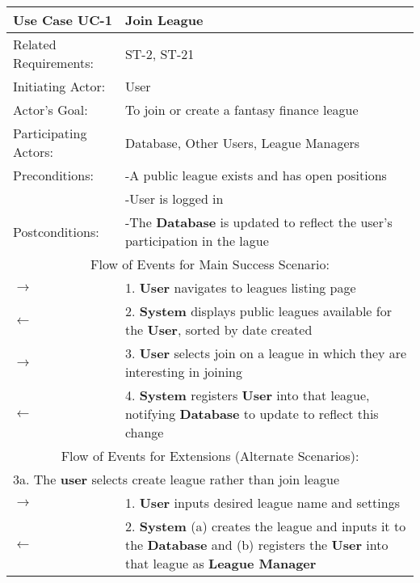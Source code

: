 \begin{centering}
\renewcommand\arraystretch{1.3} %
\begin{longtable}{|p{1.2in} p{5in}|}
\hline
\bfseries{\color{color1}Use Case UC-1} & \bfseries{\color{color1}Join League} \\
\hline
Related Requirements: & ST-2, ST-21 \\ 
Initiating Actor:     & User \\
Actor's Goal:         & To join or create a fantasy finance league \\
Participating Actors:  & Database, Other Users, League Managers\\
Preconditions:        & -A public league exists and has open positions \\
 & -User is logged in \\
Postconditions:       & -The \textbf{Database} is updated to reflect the user's participation in the lague \\
\hline
\multicolumn{2}{|c|}{\color{color1}Flow of Events for Main Success Scenario:}\\
\hline
$\rightarrow$ & 1. \textbf{User} navigates to leagues listing page \\
$\leftarrow$ & 2. \textbf{System} displays public leagues available for the \textbf{User}, sorted by date created \\
$\rightarrow$ & 3. \textbf{User} selects join on a league in which they are interesting in joining \\
$\leftarrow$ & 4. \textbf{System} registers \textbf{User} into that league, notifying \textbf{Database} to update to reflect this change \\
\hline
\multicolumn{2}{|c|}{\color{color1}Flow of Events for Extensions (Alternate Scenarios):} \\
\hline
\multicolumn{2}{|l|}{3a. The \textbf{user} selects create league rather than join league} \\
\hline
$\rightarrow$ & 1.  \textbf{User} inputs desired league name and settings \\
$\leftarrow$ & 2. \textbf{System} (a) creates the league and inputs it to the \textbf{Database} and (b) registers the \textbf{User} into that league as \textbf{League Manager} \\
\hline 
\end{longtable}
\end{centering}

